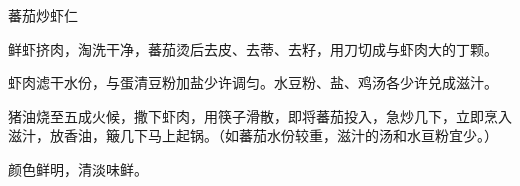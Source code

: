 %
%
%
%
%
%
%
\begin{recipe}{蕃茄炒虾仁}

\ingredients


\preparation

\step 鲜虾挤肉，淘洗干净，蕃茄烫后去皮、去蒂、去籽，用刀切成与虾肉大的丁颗。

\step 虾肉滤干水份，与蛋清豆粉加盐少许调匀。水豆粉、盐、鸡汤各少许兑成滋汁。

\step 猪油烧至五成火候，撒下虾肉，用筷子滑散，即将蕃茄投入，急炒几下，立即烹入
滋汁，放香油，簸几下马上起锅。（如蕃茄水份较重，滋汁的汤和水亘粉宜少。）

\features

颜色鲜明，清淡味鲜。

\end{recipe}

